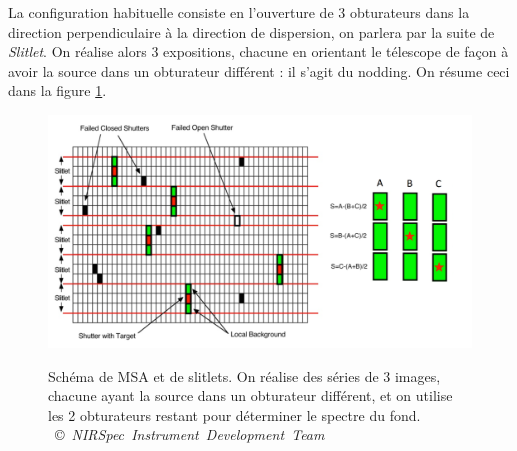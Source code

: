 \documentclass[11pt, a4paper]{article}
\newcommand{\customcite}[2]{\mbox{
  {\small \copyright} \textit{#1} \cite{#2}}
}
\begin{document}
La configuration habituelle consiste en l'ouverture de 3 obturateurs dans la direction perpendiculaire à la direction de dispersion, on parlera par la suite de \textit{Slitlet}. On réalise alors 3 expositions, chacune en orientant le télescope de façon à avoir la source dans un obturateur différent : il s'agit du nodding. On résume ceci dans la figure \ref{fig:msa_slitlet}.


\begin{figure}[H]
  \centering
  \includegraphics[scale=0.2]{assets/MSA_sky_strategy.png}
  \label{fig:msa_slitlet}
  \caption{Schéma de MSA et de slitlets. On réalise des séries de 3 images, chacune ayant la source dans un obturateur différent, et on utilise les 2 obturateurs restant pour déterminer le spectre du fond. \customcite{NIRSpec Instrument Development Team}{mos}}
\end{figure}






\printnoidxglossaries

\printbibliography %
\end{document}
